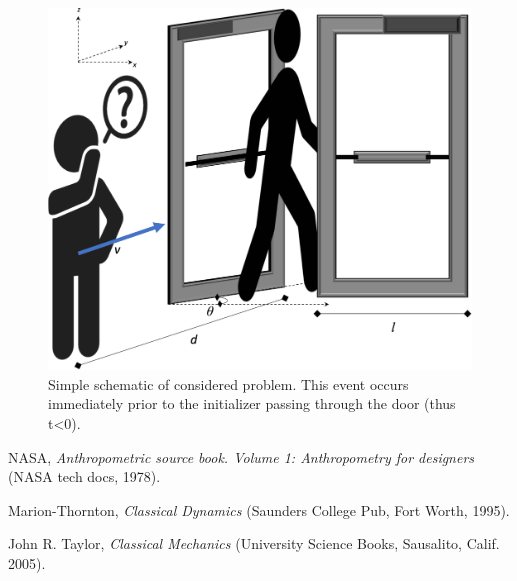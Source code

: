 \documentclass[a4paper, amsfonts, amssymb, amsmath, reprint, showkeys, nofootinbib, twoside]{revtex4-1}
\begin{document}
\begin{figure}[htp]
\centering
\includegraphics[width=\linewidth]{figures/Figure 1 - Schematic.png}
\caption{Simple schematic of considered problem. This event occurs immediately prior to the initializer passing through the door (thus t<0).}
\end{figure}






\begin{thebibliography}{4}
NASA,
\textit{Anthropometric source book. Volume 1: Anthropometry for designers}
(NASA tech docs, 1978).

Marion-Thornton,
\textit{Classical Dynamics}
(Saunders College Pub, Fort Worth, 1995).

John R. Taylor,
\textit{Classical Mechanics}
(University Science Books, Sausalito, Calif. 2005).

\end{thebibliography}

%
\end{document}
